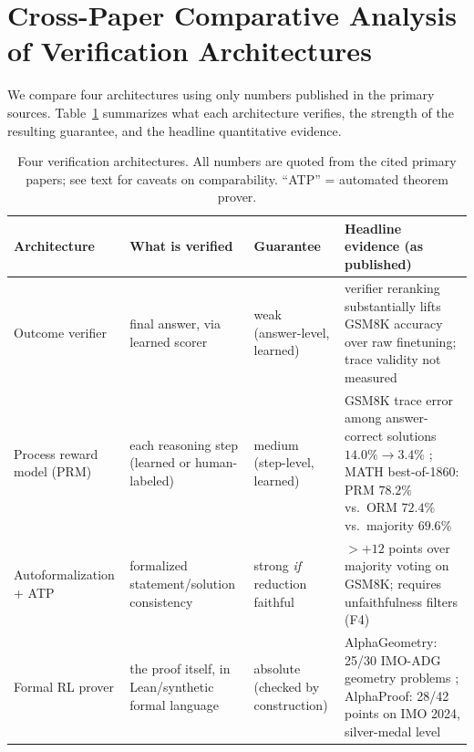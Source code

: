 \documentclass[11pt,a4paper]{article}
\begin{document}
\section{Cross-Paper Comparative Analysis of Verification Architectures}\label{sec:analysis}

We compare four architectures using only numbers published in the primary sources. Table~\ref{tab:compare} summarizes what each architecture verifies, the strength of the resulting guarantee, and the headline quantitative evidence.

\begin{table}[t]
\centering\small
\caption{Four verification architectures. All numbers are quoted from the cited primary papers; see text for caveats on comparability. ``ATP'' = automated theorem prover.}
\label{tab:compare}
\begin{tabular}{@{}p{3.05cm}p{3.2cm}p{2.9cm}p{4.9cm}@{}}
\toprule
\textbf{Architecture} & \textbf{What is verified} & \textbf{Guarantee} & \textbf{Headline evidence (as published)} \\
\midrule
Outcome verifier \citep{cobbe2021gsm8k} & final answer, via learned scorer & weak (answer-level, learned) & verifier reranking substantially lifts GSM8K accuracy over raw finetuning; trace validity not measured \\
Process reward model (PRM) \citep{uesato2022feedback,lightman2024verify} & each reasoning step (learned or human-labeled) & medium (step-level, learned) & GSM8K trace error among answer-correct solutions $14.0\%\!\to\!3.4\%$ \citep{uesato2022feedback}; MATH best-of-1860: PRM $78.2\%$ vs.\ ORM $72.4\%$ vs.\ majority $69.6\%$ \citep{lightman2024verify} \\
Autoformalization + ATP \citep{zhou2024dtv} & formalized statement/solution consistency & strong \emph{if} reduction faithful & $>+12$ points over majority voting on GSM8K; requires unfaithfulness filters (F4) \\
Formal RL prover \citep{trinh2024alphageometry,hubert2025alphaproof} & the proof itself, in Lean/synthetic formal language & absolute (checked by construction) & AlphaGeometry: 25/30 IMO-ADG geometry problems \citep{trinh2024alphageometry}; AlphaProof: 28/42 points on IMO 2024, silver-medal level \citep{hubert2025alphaproof} \\
\bottomrule
\end{tabular}
\end{table}
\end{document}
